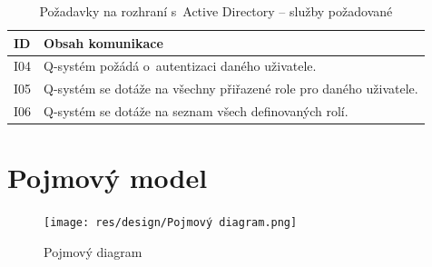 \documentclass[thesis=M,czech]{FITthesis}[2019/12/23]
\begin{document}
\begin{table}[H]
	\centering
	\begin{tabular}{|p{}|p{}|}
		\hline
  		{\textbf{ID}} & {\textbf{Obsah komunikace}} \\
  		\hline \hline
  		I04 & Q-systém požádá o~autentizaci daného uživatele. \\ \hline
		I05 & Q-systém se dotáže na všechny přiřazené role pro daného uživatele. \\ \hline
		I06 & Q-systém se dotáže na seznam všech definovaných rolí. \\ \hline
	\end{tabular}
 	\caption{Požadavky na rozhraní s~Active Directory – služby požadované}
\label{tab:Požadavky na rozhraní s~Active Directory – služby požadované}
\end{table}

\newpage

\section{Pojmový model}
\begin{figure}[H]
  \centering
  \texttt{[image: res/design/Pojmový diagram.png]}
  \caption{Pojmový diagram}
  \label{fig:Pojmový diagram}
\end{figure}
\end{document}
